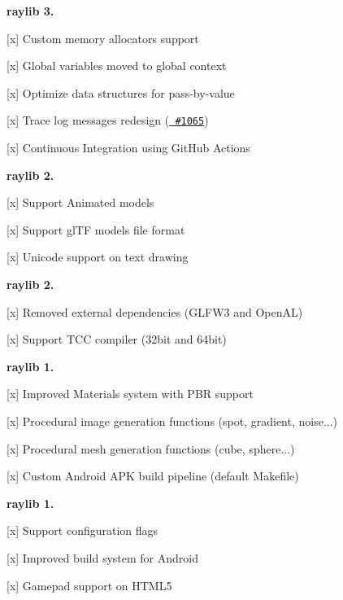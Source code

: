 {\bfseries{raylib 3.}}
\begin{DoxyItemize}
\item \mbox{[}x\mbox{]} Custom memory allocators support
\item \mbox{[}x\mbox{]} Global variables moved to global context
\item \mbox{[}x\mbox{]} Optimize data structures for pass-\/by-\/value
\item \mbox{[}x\mbox{]} Trace log messages redesign (\href{https://github.com/raysan5/raylib/issues/1065}{\texttt{ \#1065}})
\item \mbox{[}x\mbox{]} Continuous Integration using Git\+Hub Actions
\end{DoxyItemize}

{\bfseries{raylib 2.}}
\begin{DoxyItemize}
\item \mbox{[}x\mbox{]} Support Animated models
\item \mbox{[}x\mbox{]} Support gl\+TF models file format
\item \mbox{[}x\mbox{]} Unicode support on text drawing
\end{DoxyItemize}

{\bfseries{raylib 2.}}
\begin{DoxyItemize}
\item \mbox{[}x\mbox{]} Removed external dependencies (GLFW3 and Open\+AL)
\item \mbox{[}x\mbox{]} Support TCC compiler (32bit and 64bit)
\end{DoxyItemize}

{\bfseries{raylib 1.}}
\begin{DoxyItemize}
\item \mbox{[}x\mbox{]} Improved Materials system with PBR support
\item \mbox{[}x\mbox{]} Procedural image generation functions (spot, gradient, noise...)
\item \mbox{[}x\mbox{]} Procedural mesh generation functions (cube, sphere...)
\item \mbox{[}x\mbox{]} Custom Android APK build pipeline (default Makefile)
\end{DoxyItemize}

{\bfseries{raylib 1.}}
\begin{DoxyItemize}
\item \mbox{[}x\mbox{]} Support configuration flags
\item \mbox{[}x\mbox{]} Improved build system for Android
\item \mbox{[}x\mbox{]} Gamepad support on HTML5
\end{DoxyItemize}

